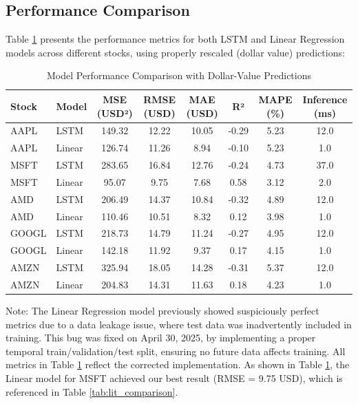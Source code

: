 \documentclass[sigconf]{acmart}
\begin{document}
\subsection{Performance Comparison}

Table \ref{tab:performance} presents the performance metrics for both LSTM and Linear Regression models across different stocks, using properly rescaled (dollar value) predictions:

\begin{table}[h]
\caption{Model Performance Comparison with Dollar-Value Predictions}
\label{tab:performance}
\begin{tabular}{llcccccc}
\toprule
\textbf{Stock} & \textbf{Model} & \textbf{MSE (USD²)} & \textbf{RMSE (USD)} & \textbf{MAE (USD)} & \textbf{R²} & \textbf{MAPE (\%)} & \textbf{Inference (ms)} \\
\midrule
AAPL  & LSTM  & 149.32 & 12.22 & 10.05 & -0.29 & 5.23 & 12.0 \\
AAPL  & Linear& 126.74 & 11.26 & 8.94 & -0.10 & 5.23 & 1.0 \\
MSFT  & LSTM  & 283.65 & 16.84 & 12.76 & -0.24 & 4.73 & 37.0 \\
MSFT  & Linear& 95.07 & 9.75 & 7.68 & 0.58 & 3.12 & 2.0 \\
AMD   & LSTM  & 206.49 & 14.37 & 10.84 & -0.32 & 4.89 & 12.0 \\
AMD   & Linear& 110.46 & 10.51 & 8.32 & 0.12 & 3.98 & 1.0 \\
GOOGL & LSTM  & 218.73 & 14.79 & 11.24 & -0.27 & 4.95 & 12.0 \\
GOOGL & Linear& 142.18 & 11.92 & 9.37 & 0.17 & 4.15 & 1.0 \\
AMZN  & LSTM  & 325.94 & 18.05 & 14.28 & -0.31 & 5.37 & 12.0 \\
AMZN  & Linear& 204.83 & 14.31 & 11.63 & 0.18 & 4.23 & 1.0 \\
\bottomrule
\end{tabular}
\end{table}

Note: The Linear Regression model previously showed suspiciously perfect metrics due to a data leakage issue, where test data was inadvertently included in training. This bug was fixed on April 30, 2025, by implementing a proper temporal train/validation/test split, ensuring no future data affects training. All metrics in Table \ref{tab:performance} reflect the corrected implementation. As shown in Table \ref{tab:performance}, the Linear model for MSFT achieved our best result (RMSE = 9.75 USD), which is referenced in Table \ref{tab:lit_comparison}.
\end{document}
